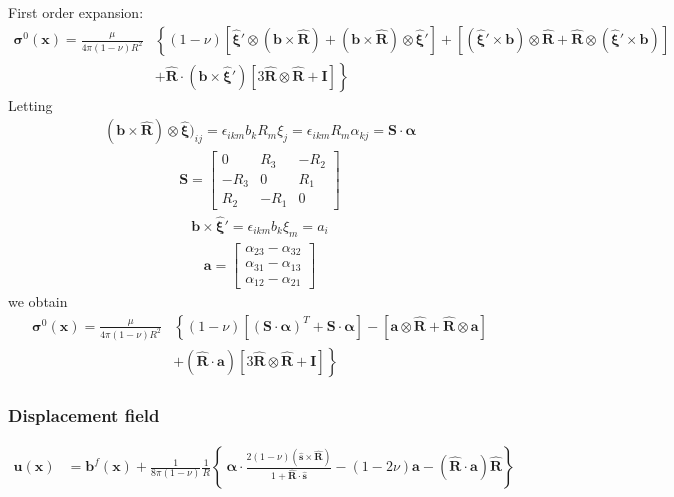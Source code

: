 First order expansion:
\begin{align}
\bm\sigma^0(\bm x)=\frac{\mu}{4\pi(1-\nu)R^2}&\left\{
(1-\nu)\left[\hat{\bm\xi}'\otimes(\bm b\times\hat{\bm R})+(\bm b\times\hat{\bm R})\otimes\hat{\bm\xi}'\right] 
+\left[(\hat{\bm \xi}'\times\bm b)\otimes\hat{\bm R}+\hat{\bm R}\otimes(\hat{\bm \xi}'\times\bm b)\right] \right. \nonumber\\
&\left.+\hat{\bm R}\cdot(\bm b\times\hat{\bm\xi}')\left[3\hat{\bm R}\otimes\hat{\bm R}+\bm I \right]
\right\}
\end{align}
Letting
\begin{align}
(\bm b\times\hat{\bm R})\otimes\hat{\bm\xi})_{ij}=\epsilon_{ikm}b_kR_m\xi_j=\epsilon_{ikm}R_m\alpha_{kj}=\mathbf{S}\cdot\mathbf{\alpha}
\end{align}
\begin{align}
\mathbf{S}=\left[\begin{array}{ccc}
0&R_3&-R_2\\
-R_3&0&R_1\\
R_2&-R_1&0
\end{array}\right]
\end{align}
\begin{align}
\bm b\times\hat{\bm \xi}'=\epsilon_{ikm}b_k\xi_m=a_i
\end{align}
\begin{align}
\mathbf{a}=\left[\begin{array}{c}
\alpha_{23}-\alpha_{32}\\
\alpha_{31}-\alpha_{13}\\
\alpha_{12}-\alpha_{21}
\end{array}\right]
\end{align}
we obtain
\begin{align}
\bm\sigma^0(\bm x)=\frac{\mu}{4\pi(1-\nu)R^2}&\left\{
(1-\nu)\left[(\mathbf{S}\cdot\mathbf{\alpha})^T+\mathbf{S}\cdot\mathbf{\alpha}\right] 
-\left[\mathbf{a}\otimes\hat{\bm R}+\hat{\bm R}\otimes\mathbf{a}\right] \right. \nonumber\\
&\left.+(\hat{\bm R}\cdot\bm a)\left[3\hat{\bm R}\otimes\hat{\bm R}+\bm I \right]
\right\}
\end{align}

\subsubsection{Displacement field}
\begin{align}
 \mathbf{u}(\mathbf x)
&=\mathbf{b}^f(\mathbf x)
+\frac{1}{8\pi(1-\nu)}  \frac{1}{R}
\left\{\ \bm\alpha\cdot\frac{2(1-\nu)(\hat{\mathbf{s}}\times\hat{\mathbf{R}})}{1+\hat{\mathbf{R}}\cdot\hat{\mathbf{s}}}
- \left(1-2\nu\right) \bm a
- \left(\hat{\mathbf{ R}}\cdot\bm a \right)\hat{\mathbf{ R}}  \right\}
\end{align}

